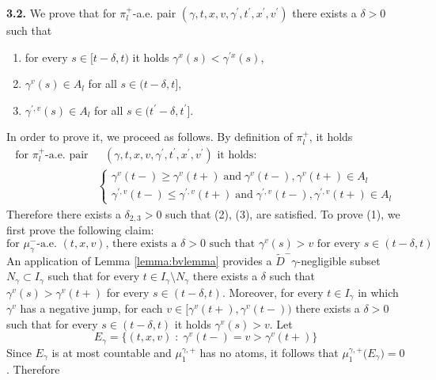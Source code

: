 \documentclass[11pt, twoside, reqno]{amsart}
\theoremstyle{definition}
\theoremstyle{remark}
\numberwithin{equation}{section}
\begin{document}
\vspace{0.5cm}
\textbf{3.2.} We prove that for $\pi^+_l$-a.e. pair $(\gamma, t, x, v, \gamma^{\prime}, t^{\prime}, x^{\prime}, v^{\prime})$ there exists a $\delta > 0$ such that 
\begin{enumerate}
    \item for every $s \in [t-\delta, t)$ it holds $\gamma^x(s)< \gamma^{\prime x}(s)$, 
    \item $\gamma^v(s) \in A_l$ for all $s \in (t-\delta, t]$,
    \item$\gamma^{\prime, v}(s) \in A_l$ for all $s \in (t^{\prime}-\delta, t^{\prime}]$.
\end{enumerate}
In order to prove it, we proceed as follows. By definition of $\pi_l^+$, it holds
\begin{equation}
\begin{aligned}
    \text{for $\pi^+_l$-a.e. pair}&  \text{ $(\gamma, t, x, v, \gamma^{\prime}, t^{\prime}, x^{\prime}, v^{\prime})$  it holds:} \\
    & \begin{cases}
          \gamma^v(t-)\geq\gamma^v(t+) \; \text{and} \; \gamma^v(t-), \gamma^v(t+) \in A_l  \\
         \gamma^{\prime,v}(t-)\leq\gamma^{\prime,v}(t+)\;  \text{and} \; \gamma^{\prime,v}(t-), \gamma^{\prime,v}(t+) \in A_l
    \end{cases}
    \end{aligned}
\end{equation}
Therefore there exists a $\delta_{2, 3} > 0$ such that (2), (3), are satisfied.  To prove (1), we first prove the following claim:
\begin{equation} \label{eq:muminuscla}
    \text{for $\mu^-_{\gamma}$-a.e. $(t, x, v)$, there exists a $\delta > 0$  such that $\gamma^v(s) > v$ for every $s \in (t-\delta, t)$}
\end{equation}
An application of Lemma \ref{lemma:bvlemma} provides a $\tilde D^-\gamma$-negligible subset $N_{\gamma} \subset I_{\gamma}$ such that 
 for every $t \in I_{\gamma} \setminus  N_{\gamma}$ there exists a $\delta$ such that $\gamma^v(s) > \gamma^v(t+)$ for every $s \in (t-\delta, t)$.
Moreover, for every $t \in I_{\gamma}$ in which $\gamma^v$ has a negative jump, for each $v \in [\gamma^v(t+), \gamma^v(t-))$ there exists a $\delta > 0$ such that for every $s \in (t-\delta, t)$ it holds $\gamma^v(s) > v$. Let 
$$
E_{\gamma} = \{(t, x, v) \; : \; \gamma^v(t-) = v> \gamma^v(t+) \}
$$
Since $E_{\gamma}$ is at most countable and $\mu_1^{\gamma,+}$ has no atoms, it follows that $\mu_1^{\gamma,+} \big( E_{\gamma}\big) = 0$. Therefore
\end{document}

